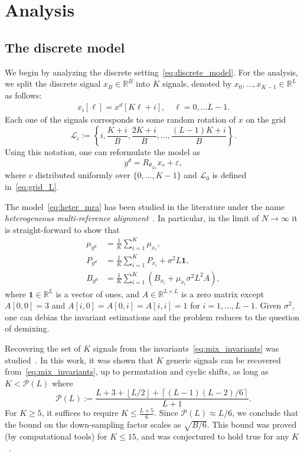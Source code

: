 \documentclass[english,12pt]{article}
\numberwithin{equation}{section}
\numberwithin{thm}{section} %
\begin{document}
\section{Analysis}

\subsection{The discrete model}

We begin by analyzing the discrete setting~\eqref{eq:discrete_model}. For the analysis, we split the discrete signal $x_B\in\mathbb{R}^B$ into $K$ signals, denoted by $x_0,\ldots,x_{K-1}\in\mathbb{R}^L$ as follows:
\begin{eqnarray} \label{eq:sub_signals}
x_i[\ell] = x^d[K\ell+i], \quad \ell=0,\ldots L-1. 
\end{eqnarray}
Each one of the signals corresponds to some random rotation of $x$ on the grid  $$\mathcal{L}_i:=\left\{i,\frac{K+i}{B},\frac{2K+i}{B},\ldots,\frac{(L-1)K+i}{B}\right\}.$$
Using this notation, one can reformulate the model as 
\begin{equation} \label{eq:heter_mra}
y^d =  R_{\theta_{\mathcal{L}_0}} x_{v} + \varepsilon,
\end{equation}
where $v$ distributed uniformly over $\{0,\ldots,K-1\}$ and $\mathcal{L}_0$ is defined in~\eqref{eq:grid_L}. 

The model~\eqref{eq:heter_mra} has been studied in the literature under the name \emph{heterogeneous multi-reference alignment}~\cite{perry2017sample,bandeira2017estimation,boumal2018heterogeneous}. In particular, in the limit of $N\to\infty$ it is straight-forward to show that 
\begin{align} \label{eq:mix_invariants}
\mu_{y^d} &= \frac{1}{K}\sum_{i=1}^K \mu_{x_i}, \nonumber\\
P_{y^d} &= \frac{1}{K}\sum_{i=1}^K P_{x_i} + \sigma^2L\mathbf{1}, \\
B_{y^d} &= \frac{1}{K}\sum_{i=1}^K (B_{x_i} +\mu_{x_i}\sigma^2L^2 A ), \nonumber
\end{align}
where $\mathbf{1}\in\mathbb{R}^L$ is a vector of ones, and $A\in\mathbb{R}^{L\times L}$ is a zero matrix except $A[0,0]=3$ and $A[i,0]=A[0,i]=A[i,i]=1$ for $i=1,\ldots,L-1$.
Given $\sigma^2$, one can debias the invariant estimations and the problem reduces to the question of demixing.

Recovering the set of $K$ signals from the invariants~\eqref{eq:mix_invariants} was studied~\cite{bandeira2017estimation}. In this work, it was shown that $K$ generic signals can be recovered from~\eqref{eq:mix_invariants}, up to permutation and cyclic shifts, as long as $K<\mathcal{P}(L)$ where
\begin{equation} \label{eq:Pl}
\mathcal{P}(L) := \frac{L+3+\left\lfloor L/2\right\rfloor +  \left\lceil (L-1)(L-2)/6\right\rceil}{L+1}.
\end{equation}
For $K\geq 5$, it suffices to require $K\leq \frac{L+5}{6}$. 
Since $\mathcal{P}(L) \approx L/6$, we conclude that the bound on the down-sampling factor scales as $\sqrt{B/6}$.
This bound was proved (by computational tools) for $K\leq 15$, and was conjectured to hold true for any $K$~\cite{bandeira2017estimation}.
\end{document}
